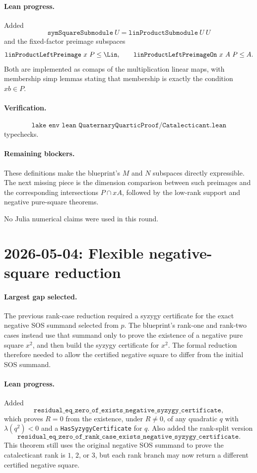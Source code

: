 \documentclass[11pt]{article}
\begin{document}
\paragraph{Lean progress.}
Added
\[
\texttt{symSquareSubmodule}\ U=\texttt{linProductSubmodule}\ U\ U
\]
and the fixed-factor preimage subspaces
\[
\texttt{linProductLeftPreimage}\ x\ P\le\Lin,\qquad
\texttt{linProductLeftPreimageOn}\ x\ A\ P\le A.
\]
Both are implemented as comaps of the multiplication linear maps, with
membership simp lemmas stating that membership is exactly the condition
\(xb\in P\).

\paragraph{Verification.}
\[
\texttt{lake env lean QuaternaryQuarticProof/Catalecticant.lean}
\]
typechecks.

\paragraph{Remaining blockers.}
These definitions make the blueprint's \(M\) and \(N\) subspaces directly
expressible.  The next missing piece is the dimension comparison between such
preimages and the corresponding intersections \(P\cap xA\), followed by the
low-rank support and negative pure-square theorems.

No Julia numerical claims were used in this round.

\section*{2026-05-04: Flexible negative-square reduction}

\paragraph{Largest gap selected.}
The previous rank-case reduction required a syzygy certificate for the exact
negative SOS summand selected from \(p\).  The blueprint's rank-one and
rank-two cases instead use that summand only to prove the existence of a
negative pure square \(x^2\), and then build the syzygy certificate for
\(x^2\).  The formal reduction therefore needed to allow the certified
negative square to differ from the initial SOS summand.

\paragraph{Lean progress.}
Added
\[
\texttt{residual\_eq\_zero\_of\_exists\_negative\_syzygy\_certificate},
\]
which proves \(R=0\) from the existence, under \(R\neq0\), of any quadratic
\(q\) with \(\lambda(q^2)<0\) and a
\texttt{HasSyzygyCertificate} for \(q\).  Also added the rank-split version
\[
\texttt{residual\_eq\_zero\_of\_rank\_case\_exists\_negative\_syzygy\_certificate}.
\]
This theorem still uses the original negative SOS summand to prove the
catalecticant rank is \(1\), \(2\), or \(3\), but each rank branch may now
return a different certified negative square.
\end{document}
